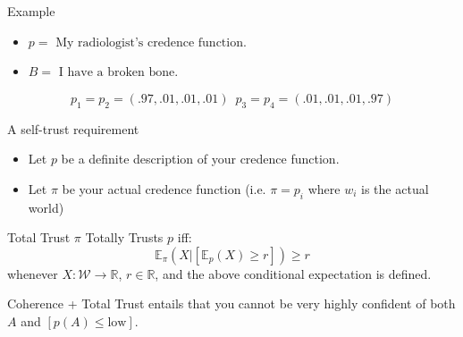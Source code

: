 \documentclass[aspectratio=169, dvipsnames]{beamer}
\newcommand{\R}{\mathbb{R}}
\newcommand{\E}{\mathbb{E}}
\newcommand{\W}{\mathcal{W}}
\begin{document}
\begin{frame}{Example}
  \begin{itemize}
  \item $p = \text{ My radiologist's credence function}$.
  \item $B = \text{ I have a broken bone}$.  
  \end{itemize}
  \begin{figure}
    \centering
  \end{figure}
  \begin{equation*}
    p_1 = p_2 = (.97, .01, .01, .01) \,\,\, p_3 = p_4 = (.01, .01, .01, .97) 
  \end{equation*}
\end{frame}

\begin{frame}{A self-trust requirement}
  \begin{itemize}
  \item Let $p$ be a definite description of your credence function.
  \item Let $\pi$ be your actual credence function (i.e. $\pi=p_i$ where $w_i$ is the actual world)
  \end{itemize}
  \begin{block}{Total Trust}
    $\pi$ Totally Trusts $p$ iff:
    \begin{equation}
      \label{totTrust}
      \E_{\pi}(X | [\E_p(X) \geq r]) \geq r
    \end{equation}
    whenever $X: \W \to \R$, $r \in \R$, and the above conditional expectation is defined.
  \end{block}

  Coherence + Total Trust entails that you cannot be very highly confident of both $A$ and $[p(A) \leq \text{low}]$.
\end{frame}
\end{document}
